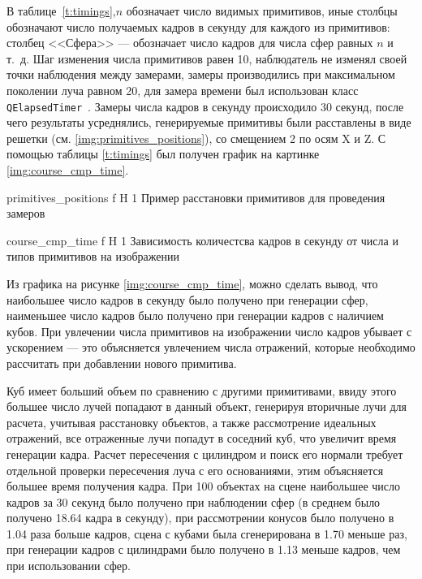 В таблице~\ref{t:timings},$n$ обозначает число видимых примитивов, иные столбцы обозначают число получаемых кадров в секунду для каждого из примитивов: столбец <<Сфера>> --- обозначает число кадров для числа сфер равных $n$ и т.~д. Шаг изменения числа примитивов равен 10, наблюдатель не изменял своей точки наблюдения между замерами, замеры производились при максимальном поколении луча равном 20, для замера времени был использован класс \texttt{QElapsedTimer}~\cite{QTimer}.
Замеры числа кадров в секунду происходило 30 секунд, после чего результаты усреднялись,  генерируемые примитивы были расставлены в виде решетки (см. \ref{img:primitives_positions}), со смещением 2 по осям X и Z. С помощью таблицы \ref{t:timings} был получен график на картинке \ref{img:course_cmp_time}.


{primitives_positions} %
{f} %
{H} %
{1\textwidth} %
{Пример расстановки примитивов для проведения замеров} %



{course_cmp_time} %
{f} %
{H} %
{1\textwidth} %
{Зависимость количестсва кадров в секунду от числа и типов примитивов на изображении} %

Из графика на рисунке \ref{img:course_cmp_time}, можно сделать вывод, что
наибольшее число кадров в секунду было получено при генерации сфер, наименьшее число кадров было получено при генерации кадров с наличием кубов. При увлечении числа примитивов на изображении число кадров убывает с ускорением --- это объясняется увлечением числа отражений, которые необходимо рассчитать при добавлении нового примитива. 

Куб имеет больший объем по сравнению с другими примитивами, ввиду этого большее число лучей попадают в данный объект, генерируя вторичные лучи для расчета, учитывая расстановку объектов, а также рассмотрение идеальных отражений, все отраженные лучи попадут в соседний куб, что увеличит время генерации кадра. 
Расчет пересечения с цилиндром и поиск его нормали требует отдельной проверки пересечения луча с его основаниями, этим объясняется большее время получения кадра. При 100 объектах на сцене наибольшее число кадров за 30 секунд было получено при наблюдении сфер (в среднем было получено 18.64 кадра в секунду), при рассмотрении конусов было получено в 1.04 раза больше кадров, сцена с кубами была сгенерирована  в 1.70 меньше раз, при генерации кадров с цилиндрами было получено  в 1.13 меньше кадров, чем при использовании сфер.








